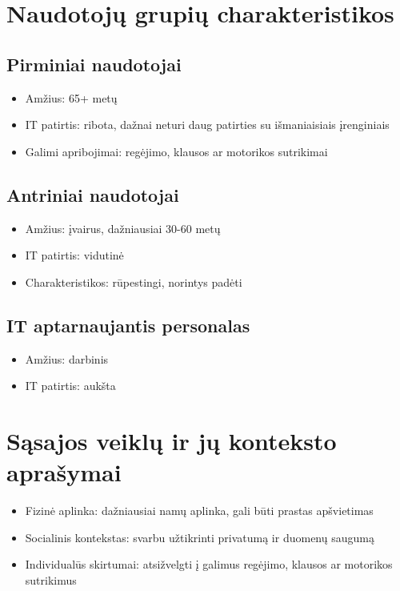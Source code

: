 \documentclass[14pt]{extarticle}
\begin{document}
\clearpage

\section{Naudotojų grupių charakteristikos}

\subsection{Pirminiai naudotojai}

\begin{itemize}
	\item Amžius: 65+ metų
	\item IT patirtis: ribota, dažnai neturi daug patirties su išmaniaisiais įrenginiais
	\item Galimi apribojimai: regėjimo, klausos ar motorikos sutrikimai
\end{itemize}

\subsection{Antriniai naudotojai}

\begin{itemize}
	\item Amžius: įvairus, dažniausiai 30-60 metų
	\item IT patirtis: vidutinė
	\item Charakteristikos: rūpestingi, norintys padėti
\end{itemize}

\subsection{IT aptarnaujantis personalas}

\begin{itemize}
	\item Amžius: darbinis
	\item IT patirtis: aukšta
\end{itemize}

\clearpage

\section{Sąsajos veiklų ir jų konteksto aprašymai}

\begin{itemize}
	\item Fizinė aplinka: dažniausiai namų aplinka, gali būti prastas apšvietimas
	\item Socialinis kontekstas: svarbu užtikrinti privatumą ir duomenų saugumą
	\item Individualūs skirtumai: atsižvelgti į galimus regėjimo, klausos ar motorikos sutrikimus
\end{itemize}
\end{document}
